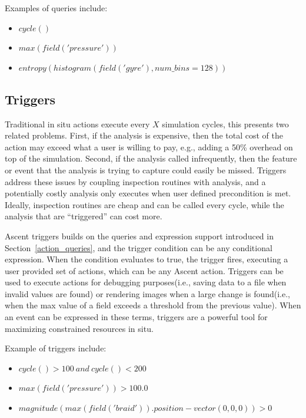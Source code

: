 Examples of queries include:
\begin{itemize}
\item $cycle()$
\item $max(field('pressure'))$
\item $entropy(histogram(field('gyre'), num\_bins=128))$
\end{itemize}
%

%
%

\subsection{Triggers}
\label{sec:ascent:triggers}
Traditional in situ actions execute every $X$ simulation cycles, this presents
two related problems.
%
First, if the analysis is expensive, then the total cost of the action may exceed
what a user is willing to pay, e.g., adding a 50\% overhead on top of the simulation.
%
Second, if the analysis called infrequently, then the feature or event that the analysis is
trying to capture could easily be missed.
%
Triggers address these issues by coupling inspection routines with analysis, and a
potentially costly analysis only executes when user defined precondition is met.
%
Ideally, inspection routines are cheap and can be called every cycle, while the analysis
that are ``triggered'' can cost more.

Ascent triggers builds on the queries and expression support introduced in
Section~\ref{action_queries}, and the trigger condition can be any conditional
expression.
%
When the condition evaluates to true, the trigger fires, executing a user provided
set of actions, which can be any Ascent action.
%
Triggers can be used to execute actions for debugging purposes(i.e., saving data to
a file when invalid values are found) or rendering images when a large
change is found(i.e., when the max value of a field exceeds a threshold from the
previous value).
%
When an event can be expressed in these terms, triggers are a powerful tool for
maximizing constrained resources in situ.

Example of triggers include:
\begin{itemize}
\item $cycle() > 100 \ and \ cycle() < 200$
\item $max(field('pressure')) > 100.0$
\item $magnitude(max(field('braid')).position - vector(0,0,0)) > 0$
\end{itemize}
